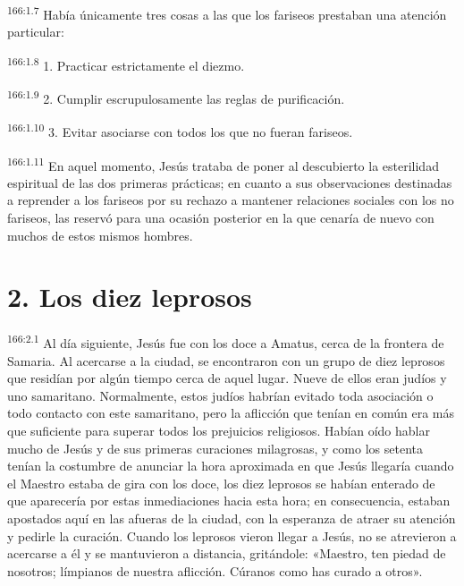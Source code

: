 \par 
\textsuperscript{166:1.7} Había únicamente tres cosas a las que los fariseos prestaban una atención particular:

\par 
\textsuperscript{166:1.8} 1. Practicar estrictamente el diezmo.

\par 
\textsuperscript{166:1.9} 2. Cumplir escrupulosamente las reglas de purificación.

\par 
\textsuperscript{166:1.10} 3. Evitar asociarse con todos los que no fueran fariseos.

\par 
\textsuperscript{166:1.11} En aquel momento, Jesús trataba de poner al descubierto la esterilidad espiritual de las dos primeras prácticas; en cuanto a sus observaciones destinadas a reprender a los fariseos por su rechazo a mantener relaciones sociales con los no fariseos, las reservó para una ocasión posterior en la que cenaría de nuevo con muchos de estos mismos hombres.

\section*{2. Los diez leprosos}
\par 
\textsuperscript{166:2.1} Al día siguiente, Jesús fue con los doce a Amatus, cerca de la frontera de Samaria. Al acercarse a la ciudad, se encontraron con un grupo de diez leprosos que residían por algún tiempo cerca de aquel lugar. Nueve de ellos eran judíos y uno samaritano. Normalmente, estos judíos habrían evitado toda asociación o todo contacto con este samaritano, pero la aflicción que tenían en común era más que suficiente para superar todos los prejuicios religiosos. Habían oído hablar mucho de Jesús y de sus primeras curaciones milagrosas, y como los setenta tenían la costumbre de anunciar la hora aproximada en que Jesús llegaría cuando el Maestro estaba de gira con los doce, los diez leprosos se habían enterado de que aparecería por estas inmediaciones hacia esta hora; en consecuencia, estaban apostados aquí en las afueras de la ciudad, con la esperanza de atraer su atención y pedirle la curación. Cuando los leprosos vieron llegar a Jesús, no se atrevieron a acercarse a él y se mantuvieron a distancia, gritándole: «Maestro, ten piedad de nosotros; límpianos de nuestra aflicción. Cúranos como has curado a otros».

